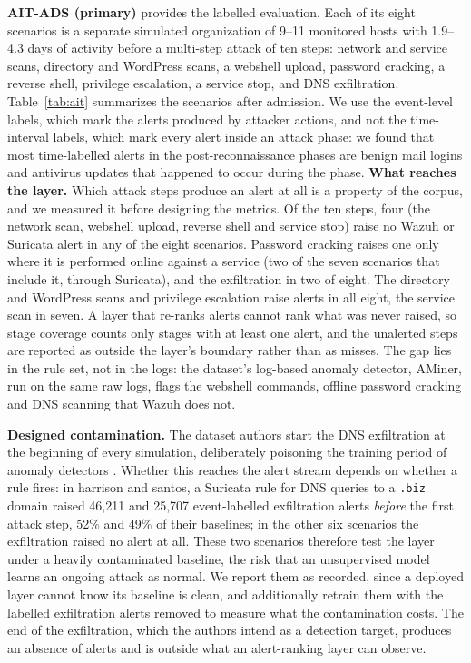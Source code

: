 \documentclass[conference]{IEEEtran}
\begin{document}
\textbf{AIT-ADS (primary)} \cite{ref21} provides the labelled evaluation. Each of its eight scenarios is a separate simulated organization of 9--11 monitored hosts with 1.9--4.3 days of activity before a multi-step attack of ten steps: network and service scans, directory and WordPress scans, a webshell upload, password cracking, a reverse shell, privilege escalation, a service stop, and DNS exfiltration. Table~\ref{tab:ait} summarizes the scenarios after admission. We use the event-level labels, which mark the alerts produced by attacker actions, and not the time-interval labels, which mark every alert inside an attack phase: we found that most time-labelled alerts in the post-reconnaissance phases are benign mail logins and antivirus updates that happened to occur during the phase. \textbf{What reaches the layer.} Which attack steps produce an alert at all is a property of the corpus, and we measured it before designing the metrics. Of the ten steps, four (the network scan, webshell upload, reverse shell and service stop) raise no Wazuh or Suricata alert in any of the eight scenarios. Password cracking raises one only where it is performed online against a service (two of the seven scenarios that include it, through Suricata), and the exfiltration in two of eight. The directory and WordPress scans and privilege escalation raise alerts in all eight, the service scan in seven. A layer that re-ranks alerts cannot rank what was never raised, so stage coverage counts only stages with at least one alert, and the unalerted steps are reported as outside the layer's boundary rather than as misses. The gap lies in the rule set, not in the logs: the dataset's log-based anomaly detector, AMiner, run on the same raw logs, flags the webshell commands, offline password cracking and DNS scanning that Wazuh does not.

\textbf{Designed contamination.} The dataset authors start the DNS exfiltration at the beginning of every simulation, deliberately poisoning the training period of anomaly detectors \cite{ref22}. Whether this reaches the alert stream depends on whether a rule fires: in harrison and santos, a Suricata rule for DNS queries to a \texttt{.biz} domain raised 46{,}211 and 25{,}707 event-labelled exfiltration alerts \emph{before} the first attack step, 52\% and 49\% of their baselines; in the other six scenarios the exfiltration raised no alert at all. These two scenarios therefore test the layer under a heavily contaminated baseline, the risk that an unsupervised model learns an ongoing attack as normal. We report them as recorded, since a deployed layer cannot know its baseline is clean, and additionally retrain them with the labelled exfiltration alerts removed to measure what the contamination costs. The end of the exfiltration, which the authors intend as a detection target, produces an absence of alerts and is outside what an alert-ranking layer can observe.
\end{document}
